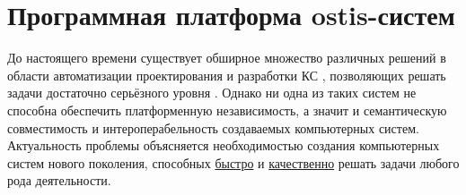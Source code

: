 \chapter{Программная платформа ostis-систем}
\label{chapter_soft_platform}


До настоящего времени существует обширное множество различных решений в области автоматизации проектирования и разработки КС \cite{iliadis2019tower}, позволяющих решать задачи достаточно серьёзного уровня \cite{lim2015ontology}. Однако ни одна из таких систем не способна обеспечить платформенную независимость, а значит и семантическую совместимость и интероперабельность создаваемых компьютерных систем. Актуальность проблемы объясняется необходимостью создания компьютерных систем нового поколения, способных \underline{быстро} и \underline{качественно} решать задачи любого рода деятельности.

